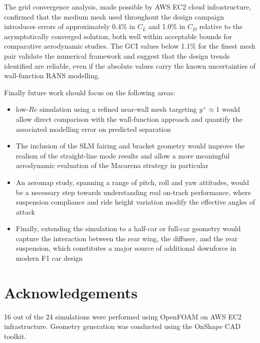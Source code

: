 \documentclass[12pt,a4paper]{article}
\begin{document}
The grid convergence analysis, made possible by AWS EC2 cloud infrastructure, confirmed that the medium mesh used throughout the design campaign introduces errors of approximately 0.4\% in $C_L$ and 1.0\% in $C_D$ relative to the asymptotically converged solution, both well within acceptable bounds for comparative aerodynamic studies. The GCI values below 1.1\% for the finest mesh pair validate the numerical framework and suggest that the design trends identified are reliable, even if the absolute values carry the known uncertainties of wall-function RANS modelling.

Finally future work should focus on the following areas:
\begin{itemize}
    \item low-$Re$ simulation using a refined near-wall mesh targeting $y^+ \approx 1$ would allow direct comparison with the wall-function approach and quantify the associated modelling error on predicted separation
    \item The inclusion of the SLM fairing and bracket geometry would improve the realism of the straight-line mode results and allow a more meaningful aerodynamic evaluation of the Macarena strategy in particular
    \item An aeromap study, spanning a range of pitch, roll and yaw attitudes, would be a  necessary step towards understanding real on-track performance, where suspension compliance and ride height variation modify the effective angles of attack
    \item Finally, extending the simulation to a half-car or full-car geometry would capture the interaction between the rear wing, the diffuser, and the rear suspension, which constitutes a major source of additional downforce in modern F1 car design
\end{itemize}

\section*{Acknowledgements}

16 out of the 24 simulations were performed using OpenFOAM on AWS EC2 infrastructure. Geometry generation was conducted using the OnShape CAD toolkit.



\clearpage
\end{document}
